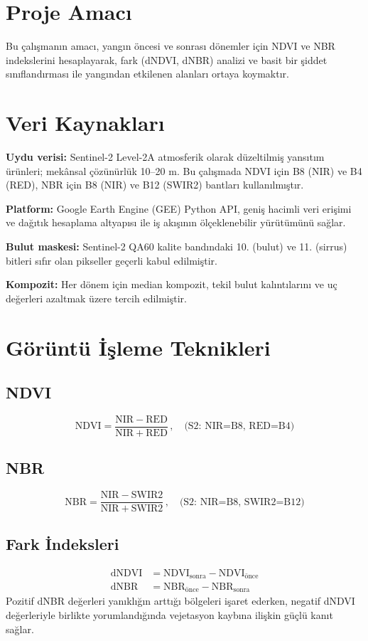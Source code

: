 \documentclass[11pt,a4paper]{article}
\begin{document}
\section{Proje Amacı}
Bu çalışmanın amacı, yangın öncesi ve sonrası dönemler için NDVI ve NBR indekslerini
hesaplayarak, fark (dNDVI, dNBR) analizi ve basit bir şiddet sınıflandırması ile
yangından etkilenen alanları ortaya koymaktır.

\section{Veri Kaynakları}

\par
\textbf{Uydu verisi:} Sentinel-2 Level-2A atmosferik olarak düzeltilmiş yansıtım
ürünleri; mekânsal çözünürlük 10--20 m. Bu çalışmada NDVI için B8 (NIR) ve B4 (RED),
NBR için B8 (NIR) ve B12 (SWIR2) bantları kullanılmıştır.
\par
\textbf{Platform:} Google Earth Engine (GEE) Python API, geniş hacimli veri erişimi ve
dağıtık hesaplama altyapısı ile iş akışının ölçeklenebilir yürütümünü sağlar.
\par
\textbf{Bulut maskesi:} Sentinel-2 QA60 kalite bandındaki 10. (bulut) ve 11. (sirrus)
bitleri sıfır olan pikseller geçerli kabul edilmiştir.
\par
\textbf{Kompozit:} Her dönem için median kompozit, tekil bulut kalıntılarını ve uç
değerleri azaltmak üzere tercih edilmiştir.

\section{Görüntü İşleme Teknikleri}
\subsection*{NDVI}
\begin{equation}
\mathrm{NDVI} = \frac{\mathrm{NIR}-\mathrm{RED}}{\mathrm{NIR}+\mathrm{RED}}\,, \quad
\text{(S2: NIR=B8, RED=B4)}
\end{equation}
\subsection*{NBR}
\begin{equation}
\mathrm{NBR} = \frac{\mathrm{NIR}-\mathrm{SWIR2}}{\mathrm{NIR}+\mathrm{SWIR2}}\,, \quad
\text{(S2: NIR=B8, SWIR2=B12)}
\end{equation}
\subsection*{Fark İndeksleri}
\begin{align}
\mathrm{dNDVI} &= \mathrm{NDVI}_{\text{sonra}} - \mathrm{NDVI}_{\text{önce}}\\
\mathrm{dNBR}  &= \mathrm{NBR}_{\text{önce}} - \mathrm{NBR}_{\text{sonra}}
\end{align}
Pozitif dNBR değerleri yanıklığın arttığı bölgeleri işaret ederken, negatif dNDVI
değerleriyle birlikte yorumlandığında vejetasyon kaybına ilişkin güçlü kanıt sağlar.
\end{document}
